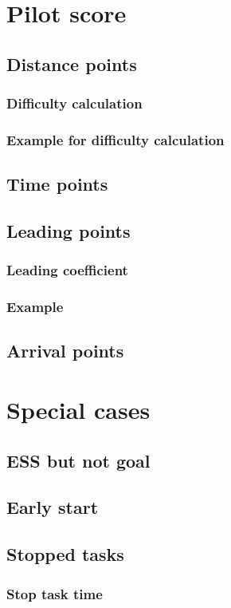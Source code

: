 \documentclass{article}
\begin{document}
\newpage
\section{Pilot score}
\subsection{Distance points}
\subsubsection{Difficulty calculation}
\subsubsection{Example for difficulty calculation}
\subsection{Time points}
\subsection{Leading points}
\subsubsection{Leading coefficient}
\subsubsection{Example}
\subsection{Arrival points}

\newpage
\section{Special cases}
\subsection{ESS but not goal}
\subsection{Early start}
\subsection{Stopped tasks}
\subsubsection{Stop task time}
\end{document}
